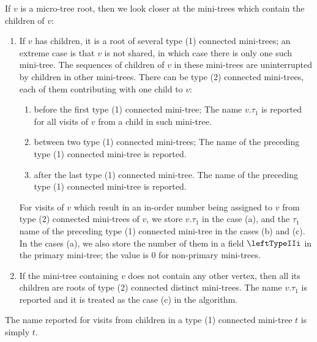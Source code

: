 If $v$ is a micro-tree root, then we look closer at the mini-trees which contain the children of $v$:
\begin{enumerate}
	\item If $v$ has children, it is a root of several type (1) connected mini-trees; an extreme case is that $v$ is not shared, in which case there is only one such mini-tree.
	The sequences of children of $v$ in these mini-trees are uninterrupted by children in other mini-trees.
	There can be type (2) connected mini-trees, each of them contributing with one child to $v$:
	\begin{enumerate}
		\item before the first type (1) connected mini-tree;
		The name $v.\tau_1$ is reported for all visits of $v$ from a child in such mini-tree.
		
		\item between two type (1) connected mini-trees;
		The name of the preceding type (1) connected mini-tree is reported.
		
		\item after the last type (1) connected mini-tree.
		The name of the preceding type (1) connected mini-tree is reported.
	\end{enumerate}
	For visits of $v$ which result in an in-order number being assigned to $v$ from type (2) connected mini-trees of $v$, we store $v.\tau_1$ in the case (a), and the $\tau_1$ name of the preceding type (1) connected mini-tree in the cases (b) and (c).
	In the cases (a), we also store the number of them in a field $\leftTypeIIi$ in the primary mini-tree; the value is $0$ for non-primary mini-trees.
	
	\item If the mini-tree containing $v$ does not contain any other vertex, then all its children are roots of type (2) connected distinct mini-trees.
	The name $v.\tau_1$ is reported and it is treated as the case (c) in the algorithm.
\end{enumerate}
The name reported for visits from children in a type (1) connected mini-tree $t$ is simply $t$.

